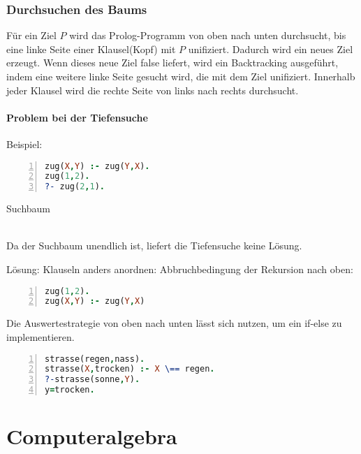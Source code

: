 \documentclass[a4paper]{scrartcl}
\begin{document}
\subsubsection{Durchsuchen des Baums} Für ein Ziel $P$ wird das Prolog-Programm von oben nach unten durchsucht, bis eine linke Seite einer Klausel(Kopf) mit $P$ unifiziert. Dadurch wird ein neues Ziel erzeugt. Wenn dieses neue Ziel false liefert, wird ein Backtracking ausgeführt, indem eine weitere linke Seite gesucht wird, die mit dem Ziel unifiziert. Innerhalb jeder Klausel wird die rechte Seite von links nach rechts durchsucht.
\paragraph{Problem bei der Tiefensuche}
Beispiel:
\begin{lstlisting}[numbers=left, tabsize=4, language=Prolog]
zug(X,Y) :- zug(Y,X).
zug(1,2).
?- zug(2,1).
\end{lstlisting}
Suchbaum\\
\\
Da der Suchbaum unendlich ist, liefert die Tiefensuche keine Lösung.

Lösung: Klauseln anders anordnen: Abbruchbedingung der Rekursion nach oben:
\begin{lstlisting}[numbers=left, tabsize=4, language=Prolog]
zug(1,2).
zug(X,Y) :- zug(Y,X)
\end{lstlisting}

Die Auswertestrategie von oben nach unten lässt sich nutzen, um ein if-else zu implementieren.
\begin{lstlisting}[numbers=left, tabsize=4, language=Prolog]
strasse(regen,nass).
strasse(X,trocken) :- X \== regen.
?-strasse(sonne,Y).
y=trocken.
\end{lstlisting}

\section{Computeralgebra}
\end{document}
